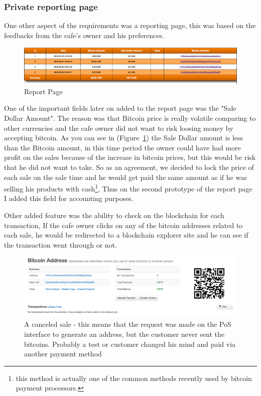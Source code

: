 \subsubsection{Private reporting page}
One other aspect of the requirements was a reporting page, this was based on the feedbacks from the cafe's owner and his preferences.

\begin{figure}[htb]
\centering
\includegraphics[width=\linewidth]{fig/report_page.png}
  \caption{Report Page}
\label{fig:report_page}
\end{figure}

One of the important fields later on added to the report page was the "Sale Dollar Amount". The reason was that Bitcoin price is really volatile comparing to other currencies and the cafe owner did not want to risk loosing money by accepting bitcoin. As you can see in (Figure~\ref{fig:report_page}) the Sale Dollar amount is less than the Bitcoin amount, in this time period the owner could have had more profit on the sales because of the increase in bitcoin prices, but this would be risk that he did not want to take. So as an agreement, we decided to lock the price of each sale on the sale time and he would get paid the same amount as if he was selling his products with cash\footnote{this method is actually one of the common methods recently used by bitcoin payment processors.}, Thus on the second prototype of the report page I added this field for accounting purposes.

Other added feature was the ability to check on the blockchain for each transaction, If the cafe owner clicks on any of the bitcoin addresses related to each sale, he would be redirected to a blockchain explorer site and he can see if the transaction went through or not.

\begin{figure}[htb]
\centering
\includegraphics[width=\linewidth]{fig/canceled_sale.png}
  \caption{A canceled sale - this means that the request was made on the PoS interface to generate an address, but the customer never sent the bitcoins. Probably a test or customer changed his mind and paid via another payment method}
\label{fig:canceled_sale}
\end{figure}


